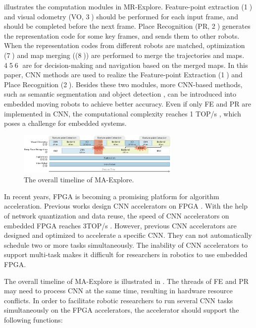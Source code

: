  illustrates the computation modules in MR-Explore.
Feature-point extraction (\textcircled{1}) and visual odometry (VO, \textcircled{3}) should be performed for each input frame, and should be completed before the next frame. 
Place Recognition (PR, \textcircled{2}) generates the representation code for some key frames, and sends them to other robots. 
When the  representation codes from different robots are matched, optimization (\textcircled{7}) and map merging ((\textcircled{8})) are performed to merge the trajectories and maps. \textcircled{4}\textcircled{5}\textcircled{6} are for decision-making and navigation based on the merged maps. 
In this paper, CNN methods are used to realize the Feature-point Extraction (\textcircled{1}) and  Place Recognition (\textcircled{2}).
Besides these two modules, more CNN-based methods, such as semantic segmentation \cite{long2015fully} and object detection \cite{ren2015faster}, can be introduced into embedded moving robots to achieve better accuracy.
Even if only FE and PR are implemented in CNN, the computational complexity reaches 1 TOP/s , which poses a challenge for embedded systems.


\begin{figure}[t]
    \centering
	\includegraphics[width=0.7\textwidth]{fig/overalltime.eps} 	
    \caption{
    The overall timeline of MA-Explore.
    }
	\label{fig:overalltime}
\end{figure}


In recent years, FPGA is becoming a promising platform for algorithm acceleration. Previous works design CNN accelerators on FPGA \cite{yu2018instruction,li_high_2016,qiu2016going,lu_evaluating_2017}. With the help of network quantization and data reuse, the speed of CNN accelerators on embedded FPGA reaches 3TOP/s \cite{lu_evaluating_2017}.
However, previous CNN accelerators are designed and optimized to accelerate a specific CNN. They can not automatically schedule two or more tasks simultaneously. 
The inability of CNN accelerators to support multi-task makes it difficult for researchers in robotics to use embedded FPGA.



The overall timeline of MA-Explore is illustrated in . 
The threads of FE and PR may need to process CNN at the same time, resulting in hardware resource conflicts. 
In order to facilitate robotic researchers to run several CNN tasks simultaneously on the FPGA accelerators, the accelerator should support the following functions:

